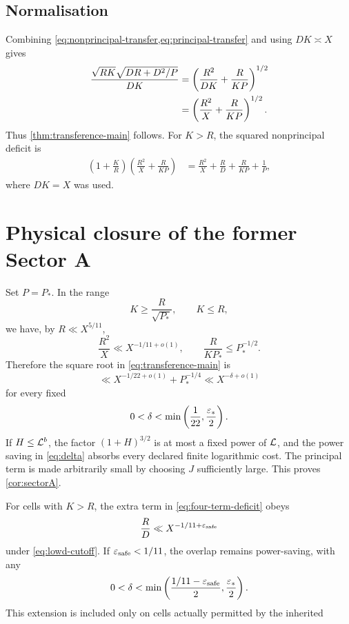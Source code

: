 \subsection{Normalisation}

Combining \cref{eq:nonprincipal-transfer,eq:principal-transfer} and using
$DK\asymp X$ gives
\begin{align}
 \frac{\sqrt{RK}\sqrt{DR+D^2/P}}{DK}
 &=\left(\frac{R^2}{DK}+\frac{R}{KP}\right)^{1/2}\notag\\
 &=\left(\frac{R^2}{X}+\frac{R}{KP}\right)^{1/2}.
 \label{eq:normalised-deficit}
\end{align}
Thus \cref{thm:transference-main} follows.  For $K>R$, the squared
nonprincipal deficit is
\begin{align}
 \left(1+\frac KR\right)
 \left(\frac{R^2}{X}+\frac{R}{KP}\right)
  &=\frac{R^2}{X}+\frac RD+\frac{R}{KP}+\frac1P,
 \label{eq:four-term-deficit}
\end{align}
where $DK=X$ was used.

\section{Physical closure of the former Sector A}\label{sec:sectorA}

Set $P=P_*$.  In the range
\begin{equation}\label{eq:enlarged-region}
             K\ge\frac{R}{\sqrt{P_*}},\qquad K\le R,
\end{equation}
we have, by $R\ll X^{5/11}$,
\begin{equation}\label{eq:sector-deficits}
       \frac{R^2}{X}\ll X^{-1/11+o(1)},
       \qquad
       \frac{R}{KP_*}\le P_*^{-1/2}.
\end{equation}
Therefore the square root in \cref{eq:transference-main} is
\begin{equation}\label{eq:delta}
 \ll X^{-1/22+o(1)}+P_*^{-1/4}
 \ll X^{-\delta+o(1)}
\end{equation}
for every fixed
\begin{equation}\label{eq:delta-range}
        0<\delta<\min\left(\frac1{22},\frac{\varepsilon_*}{2}\right).
\end{equation}
If $H\le\mathcal L^b$, the factor $(1+H)^{3/2}$ is at most a fixed power of
$\mathcal L$, and the power saving in \cref{eq:delta} absorbs every declared finite
logarithmic cost.  The principal term is made arbitrarily small by choosing
$J$ sufficiently large.  This proves \cref{cor:sectorA}.

For cells with $K>R$, the extra term in \cref{eq:four-term-deficit} obeys
\[
       \frac RD\ll X^{-1/11+\varepsilon_{\mathrm{safe}}}
\]
under \cref{eq:lowd-cutoff}.  If $\varepsilon_{\mathrm{safe}}<1/11$, the overlap remains
power-saving, with any
\begin{equation}\label{eq:delta-Kgreater}
 0<\delta<\min\left(
       \frac{1/11-\varepsilon_{\mathrm{safe}}}{2},\frac{\varepsilon_*}{2}
       \right).
\end{equation}
This extension is included only on cells actually permitted by the inherited
